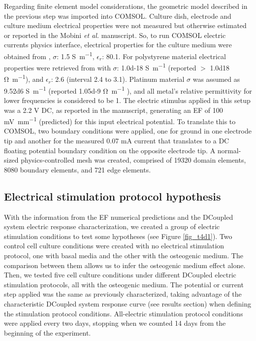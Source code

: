 Regarding finite element model considerations, the geometric model described in the previous step was imported into COMSOL. Culture dish, electrode and culture medium electrical properties were not measured but otherwise estimated or reported in the Mobini \textit{et al.} \cite{Mobini2016-jh} manuscript. So, to run COMSOL electric currents physics interface, electrical properties for the culture medium were obtained from \cite{Visone2018-sa}, $\sigma$: 1.5 \si{\siemens\per\meter}, $\epsilon_r$: 80.1. For polystyrene material electrical properties were retrieved from \cite{Plastic} with $\sigma$: \num{1.0d-18} \si{\siemens\per\meter} (reported $>$ \num{1.0d18} \si{\ohm\per\meter}), and $\epsilon_r$: 2.6 (interval 2.4 to 3.1). Platinum material $\sigma$ was assumed as \num{9.52d6} \si{\siemens\per\meter} (reported \num{1.05d-9} \si{\ohm\per\meter} \cite{Schuettler2007-zd}), and all metal's relative permittivity for lower frequencies is considered to be 1. The electric stimulus applied in this setup was a 2.2 \si{\volt} DC, as reported in the manuscript, generating an \acs{EF} of 100 \si{\milli\volt\per\milli\meter} (predicted) for this input electrical potential. To translate this to COMSOL, two boundary conditions were applied, one for ground in one electrode tip and another for the measured 0.07 \si{\milli\ampere} current \cite{Srirussamee2019-ai} that translates to a DC floating potential boundary condition on the opposite electrode tip. A normal-sized physics-controlled mesh was created, comprised of 19320 domain elements, 8080 boundary elements, and 721 edge elements. 

\subsection{Electrical stimulation protocol hypothesis}
With the information from the \acs{EF} numerical predictions and the DCoupled system electric response characterization, we created a group of electric stimulation conditions to test some hypotheses (see Figure \ref{fig_t4d1}). Two control cell culture conditions were created with no electrical stimulation protocol, one with basal media and the other with the osteogenic medium. The comparison between them allows us to infer the osteogenic medium effect alone. Then, we tested five cell culture conditions under different DCoupled electric stimulation protocols, all with the osteogenic medium. The potential or current step applied was the same as previously characterized, taking advantage of the characteristic DCoupled system response curve (see results section) when defining the stimulation protocol conditions. All-electric stimulation protocol conditions were applied every two days, stopping when we counted 14 days from the beginning of the experiment.

